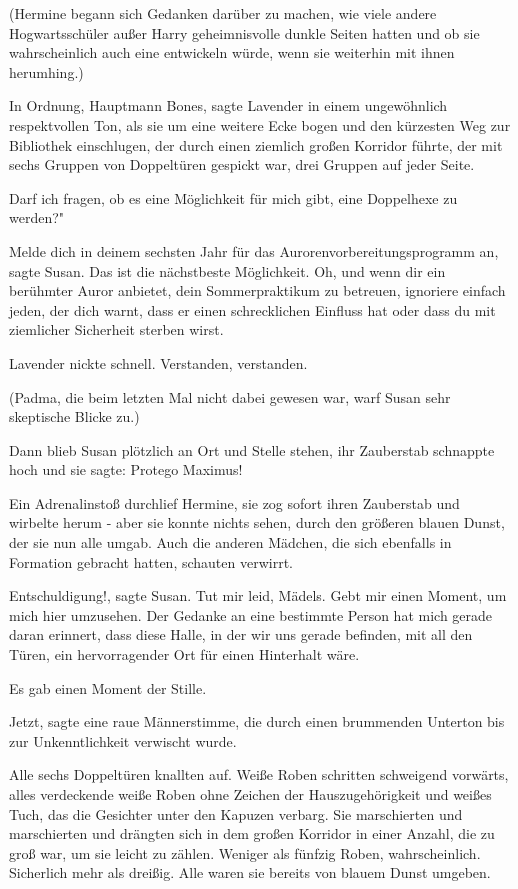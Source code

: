 (Hermine begann sich Gedanken darüber zu machen, wie viele andere
Hogwartsschüler außer Harry geheimnisvolle dunkle Seiten hatten und ob sie
wahrscheinlich auch eine entwickeln würde, wenn sie weiterhin mit ihnen
herumhing.)

\glqq{}In Ordnung, Hauptmann Bones\grqq{}, sagte Lavender in einem ungewöhnlich
respektvollen Ton, als sie um eine weitere Ecke bogen und den kürzesten Weg zur
Bibliothek einschlugen, der durch einen ziemlich großen Korridor führte, der mit
sechs Gruppen von Doppeltüren gespickt war, drei Gruppen auf jeder Seite.

\glqq{}Darf ich fragen, ob es eine Möglichkeit für mich gibt, eine Doppelhexe zu
werden?"

\glqq{}Melde dich in deinem sechsten Jahr für das Aurorenvorbereitungsprogramm
an\grqq{}, sagte Susan. \glqq{}Das ist die nächstbeste Möglichkeit. Oh, und wenn
dir ein berühmter Auror anbietet, dein Sommerpraktikum zu betreuen, ignoriere
einfach jeden, der dich warnt, dass er einen schrecklichen Einfluss hat oder
dass du mit ziemlicher Sicherheit sterben wirst.\grqq{}

Lavender nickte schnell. \glqq{}Verstanden, verstanden.\grqq{}

(Padma, die beim letzten Mal nicht dabei gewesen war, warf Susan sehr skeptische
Blicke zu.)

Dann blieb Susan plötzlich an Ort und Stelle stehen, ihr Zauberstab schnappte
hoch und sie sagte: \glqq{}Protego Maximus!\grqq{}

Ein Adrenalinstoß durchlief Hermine, sie zog sofort ihren Zauberstab und
wirbelte herum - aber sie konnte nichts sehen, durch den größeren blauen Dunst,
der sie nun alle umgab. Auch die anderen Mädchen, die sich ebenfalls in
Formation gebracht hatten, schauten verwirrt.

\glqq{}Entschuldigung!\grqq{}, sagte Susan. \glqq{}Tut mir leid, Mädels. Gebt mir
einen Moment, um mich hier umzusehen. Der Gedanke an eine bestimmte Person hat
mich gerade daran erinnert, dass diese Halle, in der wir uns gerade befinden,
mit all den Türen, ein hervorragender Ort für einen Hinterhalt wäre.\grqq{}

Es gab einen Moment der Stille.

\glqq{}Jetzt\grqq{}, sagte eine raue Männerstimme, die durch einen brummenden
Unterton bis zur Unkenntlichkeit verwischt wurde.

Alle sechs Doppeltüren knallten auf. Weiße Roben schritten schweigend vorwärts,
alles verdeckende weiße Roben ohne Zeichen der Hauszugehörigkeit und weißes
Tuch, das die Gesichter unter den Kapuzen verbarg. Sie marschierten und
marschierten und drängten sich in dem großen Korridor in einer Anzahl, die zu
groß war, um sie leicht zu zählen. Weniger als fünfzig Roben, wahrscheinlich.
Sicherlich mehr als dreißig. Alle waren sie bereits von blauem Dunst umgeben.


